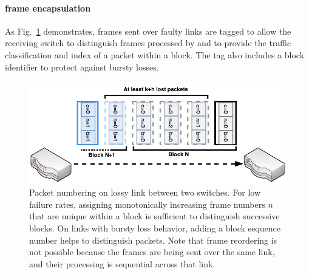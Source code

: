 \paragraph{\OurSys frame encapsulation}
As Fig.~\ref{fig:example-loss} demonstrates, frames sent over faulty links are tagged to allow the receiving switch to distinguish frames processed by \OurSys and to provide the traffic classification and index of a packet within a block. The tag also includes a block identifier to protect against bursty losses.

\begin{figure}
  \centering
  \includegraphics[width=0.35\paperwidth]{figures/example-loss.pdf}
  \caption{\label{fig:example-loss}Packet numbering on lossy link between two switches.  For low failure
  rates, assigning monotonically increasing frame numbers $n$ that are unique within a
  block is sufficient to distinguish successive blocks.  
  On links with bursty loss behavior, adding
  a block sequence number helps to distinguish packets.
  Note that frame
  reordering is not possible because the frames are being sent over the same link,
  and their processing is sequential across that link.}
\end{figure}

